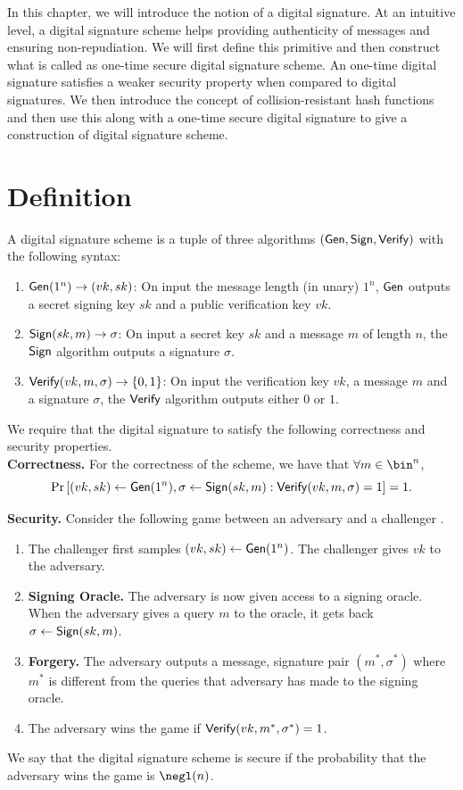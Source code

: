 \documentclass[12pt]{tufte-book}
\begin{document}
In this chapter, we will introduce the notion of a digital signature. At an intuitive level, a digital signature scheme helps providing authenticity of messages and ensuring non-repudiation. We will first define this primitive and then construct what is called as one-time secure digital signature scheme. An one-time digital signature satisfies a weaker security property when compared to digital signatures. We then introduce the concept of collision-resistant hash functions and then use this along with a one-time secure digital signature to give a construction of digital signature scheme.

\section{Definition}

A digital signature scheme is a tuple of three algorithms $(\mathsf{Gen},\mathsf{Sign},\mathsf{Verify})$ with the following syntax:
\begin{enumerate}
\item $\mathsf{Gen}(1^n)\to (vk,sk)$: On input the message length (in unary) $1^n$, $\mathsf{Gen}$ outputs a secret signing key $sk$ and a public verification key $vk$.
\item $\mathsf{Sign}(sk, m) \to \sigma$: On input a secret key $sk$ and a message $m$ of length $n$, the $\mathsf{Sign}$ algorithm outputs a signature $\sigma$.
\item $\mathsf{Verify}(vk, m, \sigma) \to \{0,1\}$: On input the verification key $vk$, a message $m$ and a signature $\sigma$, the $\mathsf{Verify}$ algorithm outputs either $0$ or $1$.
\end{enumerate}

We require that the digital signature to satisfy the following correctness and security properties.\\
\medskip
\noindent\textbf{Correctness.} For the correctness of the scheme, we have that
$\forall m \in \bin^n$,
\[\Pr \left[ (vk,sk) \gets \mathsf{Gen}(1^n), \sigma \leftarrow \mathsf{Sign}(sk,m) : \mathsf{Verify}(vk, m, \sigma) = 1 \right] = 1.\]

\medskip
\noindent\textbf{Security.} Consider the following game between an adversary and a challenger
.

\begin{enumerate}
    \item The challenger first samples $(vk,sk) \gets \mathsf{Gen}(1^n)$. The challenger gives $vk$ to the adversary.
    \item \textbf{Signing Oracle.} The adversary is now given access to a signing oracle. When the adversary gives a query $m$ to the oracle, it gets back $\sigma \gets \mathsf{Sign}(sk,m)$.
    \item \textbf{Forgery.} The adversary outputs a message, signature pair $(m^*,\sigma^*)$ where $m^*$ is different from the queries that adversary has made to the signing oracle.
    \item The adversary wins the game if $\mathsf{Verify}(vk,m^*,\sigma^*) = 1$.
\end{enumerate}
We say that the digital signature scheme is secure if the probability that the adversary wins the game is $\negl(n)$.
\end{document}
